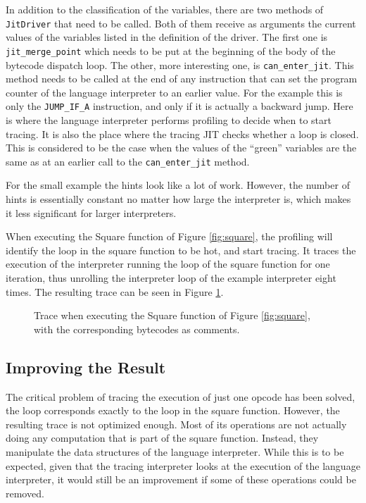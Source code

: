 \documentclass{sig-alternate}
\begin{document}
In addition to the classification of the variables, there are two methods of
\texttt{JitDriver} that need to be called. Both of them receive as arguments the
current values of the variables listed in the definition of the driver. The
first one is \texttt{jit\_merge\_point} which needs to be put at the beginning
of the body of the bytecode dispatch loop. The other, more interesting one, is
\texttt{can\_enter\_jit}. This method needs to be called at the end of any
instruction that can set the program counter of the language interpreter to an
earlier value. For the example this is only the \texttt{JUMP\_IF\_A}
instruction, and only if it is actually a backward jump. Here is
where the language interpreter performs profiling to decide
when to start tracing. It is also the place where the tracing JIT checks
whether a loop is closed. This is considered to be the case when the values of
the ``green'' variables are the same as at an earlier call to the
\texttt{can\_enter\_jit} method.

For the small example the hints look like a lot of work. However, the number of
hints is essentially constant no matter how large the interpreter is, which
makes it less significant for larger interpreters.

When executing the Square function of Figure \ref{fig:square}, the profiling
will identify the loop in the square function to be hot, and start tracing. It
traces the execution of the interpreter running the loop of the square function
for one iteration, thus unrolling the interpreter loop of the example
interpreter eight times. The resulting trace can be seen in Figure 
\ref{fig:trace-no-green-folding}.

\begin{figure}

\caption{Trace when executing the Square function of Figure \ref{fig:square},
with the corresponding bytecodes as comments.}
\label{fig:trace-no-green-folding}
\end{figure}

\subsection{Improving the Result}

The critical problem of tracing the execution of just one opcode has been
solved, the loop corresponds exactly to the loop in the square function.
However, the resulting trace is not optimized enough. Most of its operations are not
actually doing any computation that is part of the square function. Instead,
they manipulate the data structures of the language interpreter. While this is
to be expected, given that the tracing interpreter looks at the execution of the
language interpreter, it would still be an improvement if some of these operations could
be removed.
\end{document}
